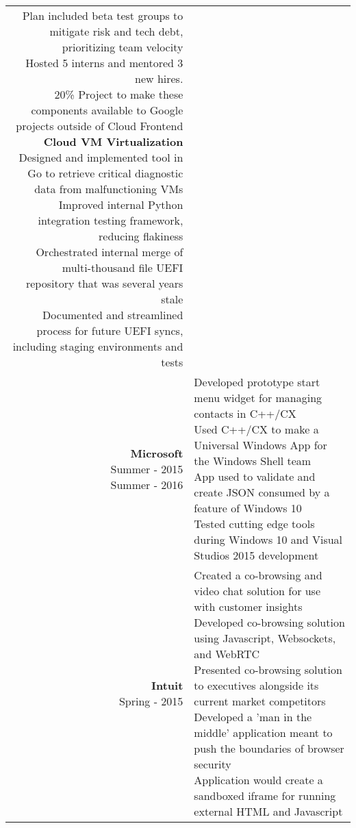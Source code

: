 \documentclass{article}
\makeatletter
\newcommand*\lineBr[2][c]{\begin{tabular}[#1]{@{}r@{}}#2\end{tabular}}
\newcommand*\lineBl[2][c]{\begin{tabular}[#1]{@{}l@{}}#2\end{tabular}}
\makeatother
\begin{document}
\begin{tabularx}{\textwidth}{ r | X }
{    Plan included beta test groups to mitigate risk and tech debt, prioritizing team velocity \\[2mm]
    Hosted 5 interns and mentored 3 new hires. \\[2mm]
    20\% Project to make these components available to Google projects outside of Cloud Frontend \\[4mm]
    {\bf Cloud VM Virtualization} \\[2mm]
    Designed and implemented tool in Go to retrieve critical diagnostic data from malfunctioning VMs \\[2mm]
    Improved internal Python integration testing framework, reducing flakiness \\[2mm]
    Orchestrated internal merge of multi-thousand file UEFI repository that was several years stale \\[2mm]
    Documented and streamlined process for future UEFI syncs, including staging environments and tests
  } \\
  \vspace{4mm}
  \lineBr{ {\large {\bf Microsoft }\\[2mm]Summer - 2015\\[2mm]Summer - 2016}} &
  \lineBl{
    Developed prototype start menu widget for managing contacts in C++/CX \\[2mm]
    Used C++/CX to make a Universal Windows App for the Windows Shell team \\[2mm]
    App used to validate and create JSON consumed by a feature of Windows 10 \\[2mm]
    Tested cutting edge tools during Windows 10 and Visual Studios 2015 development
  } \\
  \vspace{4mm}
  \lineBr{ {\large {\bf Intuit }\\[2mm]Spring - 2015}} &
  \lineBl{
    Created a co-browsing and video chat solution for use with customer insights \\[2mm]
    Developed co-browsing solution using Javascript, Websockets, and WebRTC \\[2mm]
    Presented co-browsing solution to executives alongside its current market competitors \\[2mm]
    Developed a 'man in the middle' application meant to push the boundaries of browser security \\[2mm]
    Application would create a sandboxed iframe for running external HTML and Javascript \\[2mm]
}
\end{tabularx}
\end{document}
